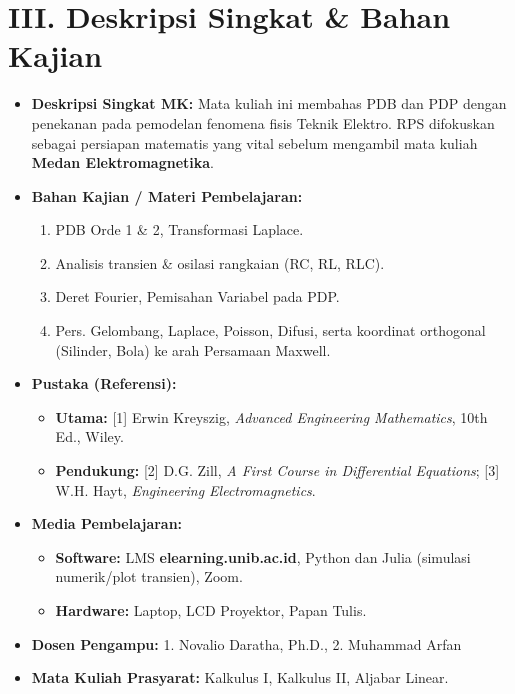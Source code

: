 \documentclass[11pt,a4paper]{article}
\begin{document}
\section*{III. Deskripsi Singkat \& Bahan Kajian}
\begin{itemize}[leftmargin=*, label=$\bullet$]
    \item \textbf{Deskripsi Singkat MK:} Mata kuliah ini membahas PDB dan PDP dengan penekanan pada pemodelan fenomena fisis Teknik Elektro. RPS difokuskan sebagai persiapan matematis yang vital sebelum mengambil mata kuliah \textbf{Medan Elektromagnetika}.
    \item \textbf{Bahan Kajian / Materi Pembelajaran:}
    \begin{enumerate}[label=\arabic*., noitemsep]
        \item PDB Orde 1 \& 2, Transformasi Laplace.
        \item Analisis transien \& osilasi rangkaian (RC, RL, RLC).
        \item Deret Fourier, Pemisahan Variabel pada PDP.
        \item Pers. Gelombang, Laplace, Poisson, Difusi, serta koordinat orthogonal (Silinder, Bola) ke arah Persamaan Maxwell.
    \end{enumerate}
    \item \textbf{Pustaka (Referensi):}
    \begin{itemize}[leftmargin=*, label=$\circ$]
        \item \textbf{Utama:} [1] Erwin Kreyszig, \textit{Advanced Engineering Mathematics}, 10th Ed., Wiley.
        \item \textbf{Pendukung:} [2] D.G. Zill, \textit{A First Course in Differential Equations}; [3] W.H. Hayt, \textit{Engineering Electromagnetics}.
    \end{itemize}
    \item \textbf{Media Pembelajaran:}
    \begin{itemize}[leftmargin=*, label=$\circ$]
        \item \textbf{Software:} LMS \textbf{elearning.unib.ac.id}, Python dan Julia (simulasi numerik/plot transien), Zoom.
        \item \textbf{Hardware:} Laptop, LCD Proyektor, Papan Tulis.
    \end{itemize}
    \item \textbf{Dosen Pengampu:} 1. Novalio Daratha, Ph.D., 2. Muhammad Arfan
    \item \textbf{Mata Kuliah Prasyarat:} Kalkulus I, Kalkulus II, Aljabar Linear.
\end{itemize}
\end{document}
